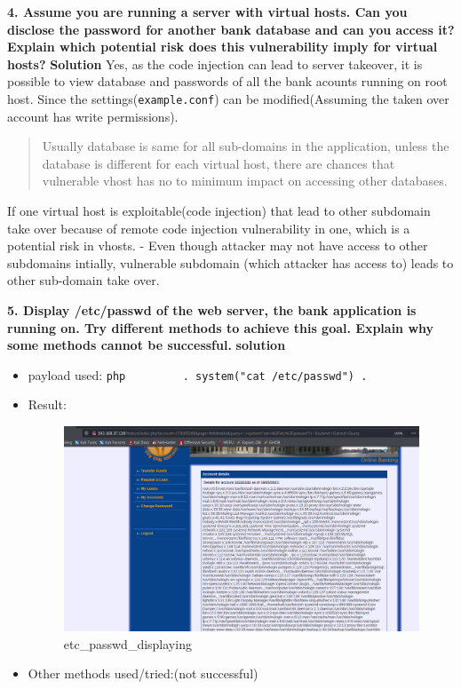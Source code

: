 \textbf{4. Assume you are running a server with virtual hosts. Can you
disclose the password for another bank database and can you access it?
Explain which potential risk does this vulnerability imply for virtual
hosts?} \textbf{Solution} Yes, as the code injection can lead to server
takeover, it is possible to view database and passwords of all the bank
acounts running on root host. Since the settings(\texttt{example.conf})
can be modified(Assuming the taken over account has write permissions).

\begin{quote}
Usually database is same for all sub-domains in the application, unless
the database is different for each virtual host, there are chances that
vulnerable vhost has no to minimum impact on accessing other databases.
\end{quote}

If one virtual host is exploitable(code injection) that lead to other
subdomain take over because of remote code injection vulnerability in
one, which is a potential risk in vhosts. - Even though attacker may not
have access to other subdomains intially, vulnerable subdomain (which
attacker has access to) leads to other sub-domain take over.

\textbf{5. Display /etc/passwd of the web server, the bank application
is running on. Try different methods to achieve this goal. Explain why
some methods cannot be successful.} \textbf{solution}

\begin{itemize}
\item
  payload used:
  \texttt{php\ \ \ \ \ \ \ \ \ \textquotesingle{}.\ system("cat\ /etc/passwd")\ .\textquotesingle{}}
\item
  Result:

  \begin{figure}
  \centering
  \includegraphics{images/task2/etc_passwd.PNG}
  \caption{etc\_passwd\_displaying}
  \end{figure}
\item
  Other methods used/tried:(not successful)
\end{itemize}

